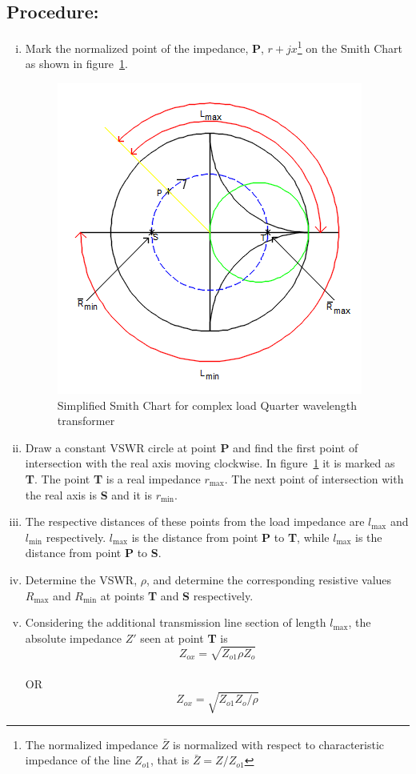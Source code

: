 \subsection*{Procedure:}
\begin{enumerate}[(i)]
\item Mark the normalized point of the impedance, \textbf{P}, $r + jx$\footnote{
The normalized impedance $ \bar{Z}$ is normalized with respect to characteristic impedance of the line $ Z_{o1}$, that is $ \bar{Z} = Z/ Z_{o1}$
} on the Smith Chart as shown in figure~\ref{fig:sinsmith}.
\begin{figure}[h]
\centering
\includegraphics[scale=0.6]{./graphics/sinsmith}
\caption{ Simplified Smith Chart for complex load Quarter wavelength transformer}
\label{fig:sinsmith}
\end{figure}

\item Draw a constant VSWR circle at point \textbf{P} and find the first point of intersection with the real axis moving clockwise. In figure~\ref{fig:sinsmith} it is marked as \textbf{T}. The point \textbf{T} is a real impedance $r_\max$. The next point of intersection with the real axis is \textbf{S} and it is $r_\min$.
\item The respective distances of these points from the load impedance are $ l_\max$ and $ l_\min$ respectively. $ l_\max$ is the distance from point \textbf{P} to \textbf{T}, while $ l_\max$ is the distance from point \textbf{P} to \textbf{S}.
\item Determine the VSWR, $\rho$, and determine the corresponding resistive values $R_\max$ and $R_\min$ at points \textbf{T} and \textbf{S} respectively. 
\item Considering the additional transmission line section of length $ l_\max$, the absolute impedance $ Z'$ seen at point \textbf{T} is
\begin{equation}
\boxed{Z_{ox}=\sqrt{Z_{o1}\rho Z_o}} 
\end{equation}
\\OR
\begin{equation}
\boxed{Z_{ox}=\sqrt{Z_{o1}Z_o/\rho}}
\end{equation}


\end{enumerate}
